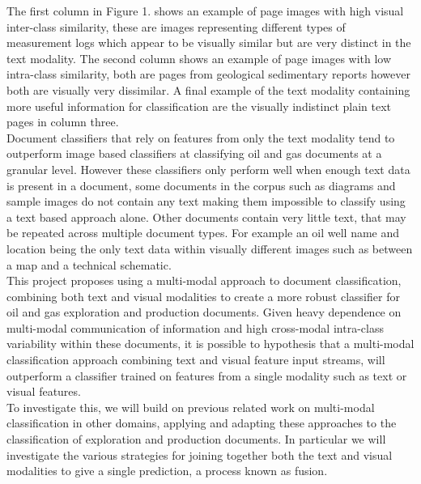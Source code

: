 \documentclass[a4paper,12pt]{article}
\begin{document}
The first column in Figure 1. shows an example of page images with high visual inter-class similarity, these are images representing different types of measurement logs which appear to be visually similar but are very distinct in the text modality. The second column shows an example of page images with low intra-class similarity, both are pages from geological sedimentary reports however both are visually very dissimilar. A final example of the text modality containing more useful information for classification are the visually indistinct plain text pages in column three. \\

Document classifiers that rely on features from only the text modality tend to outperform image based classifiers at classifying oil and gas documents at a granular level. However these classifiers only perform well when enough text data is present in a document, some documents in the corpus such as diagrams and sample images do not contain any text making them impossible to classify using a text based approach alone. Other documents contain very little text, that may be repeated across multiple document types. For example an oil well name and location being the only text data within visually different images such as between a map and a technical schematic. \\

This project proposes using a multi-modal approach to document classification, combining both text and visual modalities to create a more robust classifier for oil and gas exploration and production documents. Given heavy dependence on multi-modal communication of information and high cross-modal intra-class variability within these documents, it is possible to hypothesis that a multi-modal classification approach combining text and visual feature input streams, will outperform a classifier trained on features from a single modality such as text or visual features. \\

To investigate this, we will build on previous related work on multi-modal classification in other domains, applying and adapting these approaches to the classification of exploration and production documents. In particular we will investigate the various strategies for joining together both the text and visual modalities to give a single prediction, a process known as fusion. \\
\end{document}
